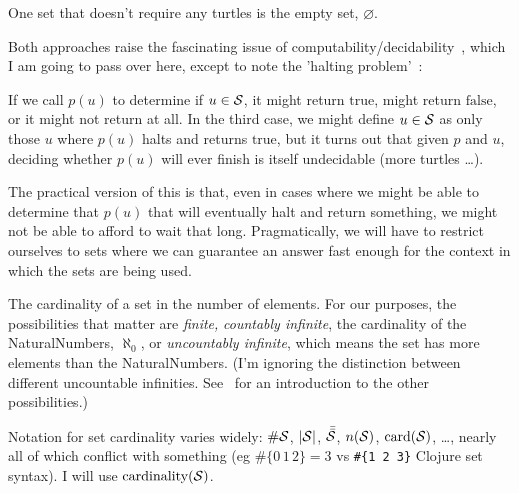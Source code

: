 One set that doesn't require any turtles is 
the empty set, $\varnothing$.


Both approaches raise the fascinating issue of 
computability/decidability~\cite{Church:1936:Unsolvable,
Turing:1936:Computability,
Turing:1938:ComputabilityCorrection,
Turing:1937:ComputabilityLambda},
which I am going to pass over here, except to note the 
'halting problem'~\cite{wiki:HaltingProblem}:

If we call $p(u)$ to determine if $u \in \mathcal{S}$, 
it might return $\text{true}$, might return $\text{false}$,
or it might not return at all.
In the third case, we might define $u \in \mathcal{S}$ as only those
$u$ where $p(u)$ halts and returns $\text{true}$, but it turns 
out that given $p$ and $u$, deciding whether $p(u)$ will ever
finish is itself undecidable (more turtles \ldots).

The practical version of this is that, even in cases where we
might be able to determine that $p(u)$ that will eventually halt
and return something, we might not be able to afford to wait that
long.
Pragmatically, we will have to restrict ourselves to sets where we
can guarantee an answer fast enough for the context in which the
sets are being used.


The cardinality of a set in the number of elements.
For our purposes, the possibilities that matter are \emph{finite,}
\emph{countably infinite}, the cardinality of the
\gls{NaturalNumbers}, $\aleph_{0}$, or \emph{uncountably
infinite}, which means the set has more elements than the
\gls{NaturalNumbers}.
(I'm ignoring the distinction between different uncountable
infinities.
See~\cite{wiki:CardinalNumbers} for an introduction to the other
possibilities.)

Notation for set cardinality varies widely:
$\#\mathcal{S}$,  $|\mathcal{S}|$,
$\bar{\bar{\mathcal{S}}}$, $n(\mathcal{S})$,
$\text{card}(\mathcal{S})$, \ldots, nearly all of which conflict
with something (eg $\#\{ 0 \, 1 \, 2 \} = 3$ vs 
\lstinline|#{1 2 3}| Clojure set syntax).
I will use $\text{cardinality}(\mathcal{S})$.


